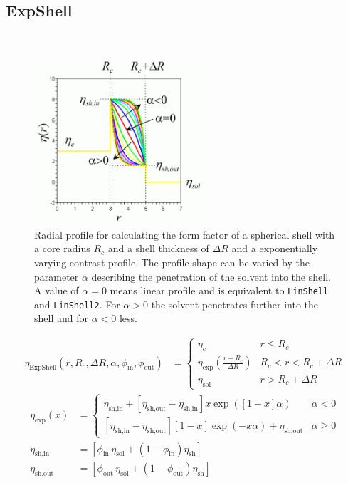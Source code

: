 
\clearpage
\subsection{ExpShell}
\label{sect:ExpShell} ~\\

\begin{figure}[htb]
\begin{center}
\includegraphics[width=0.55\textwidth,height=0.5\textwidth]{../images/form_factor/spheres/ExpShell.png}
\end{center}
\caption{Radial profile for calculating the form factor of a spherical shell with a core radius
$R_c$ and a shell thickness of $\Delta R$ and a exponentially varying contrast
profile. The profile shape can be varied by the parameter $\alpha$ describing the penetration of the solvent into the shell.
A value of $\alpha=0$ means linear profile and is equivalent to {\tt LinShell}
and {\tt LinShell2}. For $\alpha>0$ the solvent penetrates further into the shell
and for $\alpha<0$ less.} \label{ExpShellProfile}
\end{figure}

\noindent
\begin{align}
\eta_\text{ExpShell}(r,R_c,\Delta R,\alpha,\phi_\text{in},\phi_\text{out}) &=
\begin{cases}
\eta_c              & r \leq R_c  \\
\eta_\text{exp}(\frac {r-R_c}{\Delta R})   & R_c < r< R_c+\Delta R \\
\eta_\text{sol}     & r> R_c+\Delta R
\end{cases}
\end{align}
\begin{align}
\eta_\text{exp} (x) &=
\begin{cases}
\eta_\text{sh,in}  +
\left[\eta_\text{sh,out}-\eta_\text{sh,in}\right] x \exp\left( \left[ 1-x \right] \alpha\right)
 & \alpha<0 \\[2mm]
\left[\eta_\text{sh,in}-\eta_\text{sh,out}\right] \left[1-x\right] \exp\left(-{x\alpha}\right) +
 \eta_\text{sh,out}& \alpha \geq 0
\end{cases} \\[2mm]
\eta_\text{sh,in} & = \left[ \phi_\text{in}\,\eta_\text{sol}+ \left( 1-\phi_\text{in} \right)
 \eta_\text{sh} \right] \\
\eta_\text{sh,out} & = \left[ \phi_\text{out}\,\eta_\text{sol}+ \left( 1-\phi_\text{out} \right) \eta_\text{sh} \right]
\end{align}

